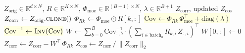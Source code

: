\documentclass[8pt]{article}
\begin{document}
\begin{tcolorbox}[
    title={\textbf{Algorithm 2a:} Original Harmony --- Per-cluster Matrix Inverse},
    colback=white, colframe=black!60, fonttitle=\small\bfseries,
    boxrule=0.5pt, arc=2pt, left=4pt, right=4pt, top=2pt, bottom=2pt
]
\begin{algorithmic}[1]
\small
\Require $Z_{\text{orig}} \in \mathbb{R}^{d \times N}$, $R \in \mathbb{R}^{K \times N}$, $\Phi_{\text{moe}} \in \mathbb{R}^{(B+1) \times N}$, $\lambda \in \mathbb{R}^{B+1}$
\Ensure $Z_{\text{corr}}$, updated $Z_{\text{cos}}$
\State $Z_{\text{corr}} \gets Z_{\text{orig}}.\textsc{clone}()$
    \State $\Phi_{Rk} \gets \Phi_{\text{moe}} \odot R[k,:]$
    \State \colorbox{lightyellow}{$\text{Cov} \gets \Phi_{Rk} \, \Phi_{\text{moe}}^\top + \text{diag}(\lambda)$}
    \State \colorbox{lightyellow}{$\text{Cov}^{-1} \gets \textsc{Inv}(\text{Cov})$} 
    \State $W \gets \sum_{b=0}^{B} \text{Cov}^{-1}_{:,b} \cdot \left(\sum_{i \in \text{batch}_b} R_{k,i} \, Z_{:,i}\right)^\top$
    \State $W[0,:] \gets 0$ 
    \State $Z_{\text{corr}} \gets Z_{\text{corr}} - W^\top \, \Phi_{Rk}$
\EndFor
\State $Z_{\text{cos}} \gets Z_{\text{corr}} \,/\, \|Z_{\text{corr}}\|_2$
\end{algorithmic}
\end{tcolorbox}

\vspace{4pt}
\end{document}
